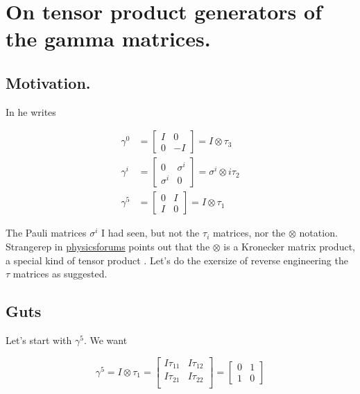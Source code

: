 
%

\chapter{On tensor product generators of the gamma matrices.}
\label{chap:zeeTauMatrix}
{}
\date{June 20, 2011}

\beginArtNoToc

\section{Motivation.}

In \cite{zee2005quantum} he writes

\begin{align*}
\gamma^0 &=
\begin{bmatrix}
I & 0 \\
0 & -I
\end{bmatrix}
=
I \otimes \tau_3 \\
\gamma^i &=
\begin{bmatrix}
0 & \sigma^i \\
\sigma^i & 0
\end{bmatrix}
=
\sigma^i \otimes i \tau_2 \\
\gamma^5 &=
\begin{bmatrix}
0 & I \\
I & 0
\end{bmatrix}
=
I \otimes \tau_1
\end{align*}

The Pauli matrices $\sigma^i$ I had seen, but not the $\tau_i$ matrices, nor the $\otimes$ notation.  Strangerep in \href{http://www.physicsforums.com/showthread.php?p=3365680\#post3365680}{physicsforums} points out that the $\otimes$ is a Kronecker matrix product, a special kind of tensor product \cite{wiki:tensorProduct}.  Let's do the exersize of reverse engineering the $\tau$ matrices as suggested.

\section{Guts}

Let's start with $\gamma^5$.  We want 

\begin{equation}\label{eqn:zeeTauMatrix:10}
\gamma^5 = I \otimes \tau_1 =
\begin{bmatrix}
I \tau_{11} & I \tau_{12} \\
I \tau_{21} & I \tau_{22} \\
\end{bmatrix}
= 
\begin{bmatrix}
0 & 1 \\
1 & 0
\end{bmatrix}
\end{equation}


